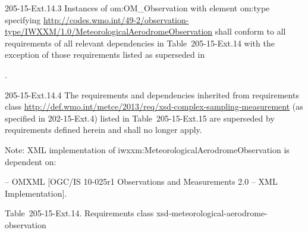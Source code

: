 205-15-Ext.14.3 Instances of om:OM\_Observation with element om:type specifying \url{http://codes.wmo.int/49-2/observation-type/IWXXM/1.0/MeteorologicalAerodromeObservation} shall conform to all requirements of all relevant dependencies in Table~205-15-Ext.14 with the exception of those requirements listed as superseded in

.

205-15-Ext.14.4 The requirements and dependencies inherited from requirements class \url{http://def.wmo.int/metce/2013/req/xsd-complex-sampling-measurement} (as specified in 202-15-Ext.4) listed in Table~205-15-Ext.15 are superseded by requirements defined herein and shall no longer apply.

Note: XML implementation of iwxxm:MeteorologicalAerodromeObservation is dependent on:

-- OMXML {[}OGC/IS 10-025r1 Observations and Measurements 2.0 -- XML Implementation{]}.

Table~205-15-Ext.14. Requirements class xsd-meteorological-aerodrome-observation


